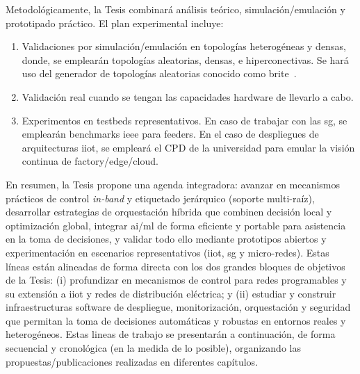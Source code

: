 Metodológicamente, la Tesis combinará análisis teórico, simulación/emulación y prototipado práctico. El plan experimental incluye:

\begin{enumerate}
    \item Validaciones por simulación/emulación en topologías heterogéneas y densas, donde, se emplearán topologías aleatorias, densas, e hiperconectivas. Se hará uso del generador de topologías aleatorias conocido como \gls{brite}~\cite{brite}.

    \item Validación real cuando se tengan las capacidades hardware de llevarlo a cabo.

    \item Experimentos en testbeds representativos. En caso de trabajar  con las \gls{sg}, se emplearán benchmarks \gls{ieee} para feeders. En el caso de despliegues de arquitecturas \gls{iiot}, se empleará el CPD de la universidad para emular la visión continua de factory/edge/cloud. 

\end{enumerate}


En resumen, la Tesis propone una agenda integradora: avanzar en mecanismos prácticos de control \textit{in-band} y etiquetado jerárquico (soporte multi-raíz), desarrollar estrategias de orquestación híbrida que combinen decisión local y optimización global, integrar \gls{ai}/\gls{ml} de forma eficiente y portable para asistencia en la toma de decisiones, y validar todo ello mediante prototipos abiertos y experimentación en escenarios representativos (\gls{iiot}, \gls{sg} y micro-redes). Estas líneas están alineadas de forma directa con los dos grandes bloques de objetivos de la Tesis: (i) profundizar en mecanismos de control para redes programables y su extensión a \gls{iiot} y redes de distribución eléctrica; y (ii) estudiar y construir infraestructuras software de despliegue, monitorización, orquestación y seguridad que permitan la toma de decisiones automáticas y robustas en entornos reales y heterogéneos. Estas lineas de trabajo se presentarán a continuación, de forma secuencial y cronológica (en la medida de lo posible), organizando las propuestas/publicaciones realizadas en diferentes capítulos. 


